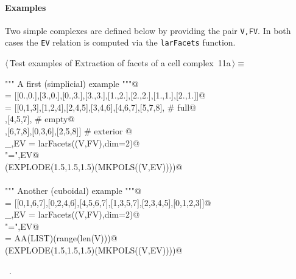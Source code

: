 \documentclass[11pt,oneside]{article}	%
\begin{document}
\paragraph{Examples}
Two simple complexes are defined below by providing the pair \texttt{V,FV}.
In both cases the \texttt{EV} relation is computed via the \texttt{larFacets} function.
\begin{flushleft} \small \label{scrap20}
\protect{}$\langle\,$Test examples of Extraction of facets of a cell complex\nobreak\ {\footnotesize 11a}$\,\rangle\equiv$
\vspace{-1ex}
\begin{list}{}{} \item
\mbox{}\verb@""" A first (simplicial) example """@\\
\mbox{}\verb@V = [[0.,0.],[3.,0.],[0.,3.],[3.,3.],[1.,2.],[2.,2.],[1.,1.],[2.,1.]]@\\
\mbox{}\verb@FV = [[0,1,3],[1,2,4],[2,4,5],[3,4,6],[4,6,7],[5,7,8], # full@\\
\mbox{}\verb@   [1,3,4],[4,5,7], # empty@\\
\mbox{}\verb@   [0,1,2],[6,7,8],[0,3,6],[2,5,8]] # exterior     @\\
\mbox{}\verb@_,EV = larFacets((V,FV),dim=2)@\\
\mbox{}\verb@print "\nEV =",EV@\\
\mbox{}\verb@VIEW(EXPLODE(1.5,1.5,1.5)(MKPOLS((V,EV))))@\\
\mbox{}\verb@@\\
\mbox{}\verb@""" Another (cuboidal) example """@\\
\mbox{}\verb@FV = [[0,1,6,7],[0,2,4,6],[4,5,6,7],[1,3,5,7],[2,3,4,5],[0,1,2,3]]@\\
\mbox{}\verb@_,EV = larFacets((V,FV),dim=2)@\\
\mbox{}\verb@print "\nEV =",EV@\\
\mbox{}\verb@VV = AA(LIST)(range(len(V)))@\\
\mbox{}\verb@VIEW(EXPLODE(1.5,1.5,1.5)(MKPOLS((V,EV))))@\\
\mbox{}\verb@@{\NWsep}
\end{list}
\vspace{-1ex}
\footnotesize\addtolength{\baselineskip}{-1ex}
\begin{list}{}{\setlength{\itemsep}{-\parsep}\setlength{\itemindent}{-\leftmargin}}
\item \NWtxtMacroRefIn\ .
\end{list}
\end{flushleft}
\end{document}
